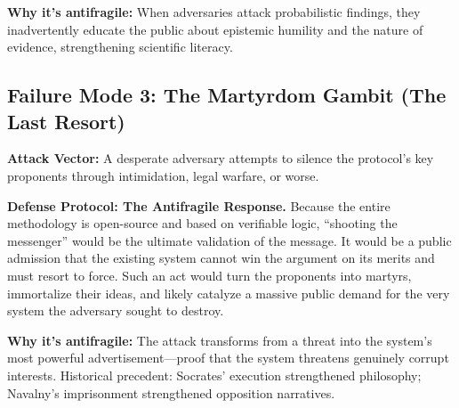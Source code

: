 \documentclass[11pt,a4paper]{article}
\begin{document}
\begin{small}
\textbf{Why it's antifragile:} When adversaries attack probabilistic findings, they inadvertently educate the public about epistemic humility and the nature of evidence, strengthening scientific literacy.

\subsection{Failure Mode 3: The Martyrdom Gambit (The Last Resort)}
\textbf{Attack Vector:} A desperate adversary attempts to silence the protocol's key proponents through intimidation, legal warfare, or worse.

\textbf{Defense Protocol: The Antifragile Response.} Because the entire methodology is open-source and based on verifiable logic, ``shooting the messenger'' would be the ultimate validation of the message. It would be a public admission that the existing system cannot win the argument on its merits and must resort to force. Such an act would turn the proponents into martyrs, immortalize their ideas, and likely catalyze a massive public demand for the very system the adversary sought to destroy.

\textbf{Why it's antifragile:} The attack transforms from a threat into the system's most powerful advertisement—proof that the system threatens genuinely corrupt interests. Historical precedent: Socrates' execution strengthened philosophy; Navalny's imprisonment strengthened opposition narratives.

\begin{figure}[h!]
\centering
{}
\end{figure}
\end{small}
\end{document}
